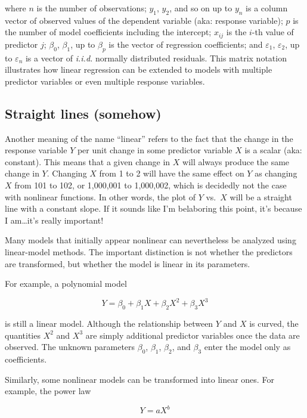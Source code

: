 \documentclass[
  13,
  letterpaper,
]{report}
\begin{document}
where \(n\) is the number of observations; \(y_1\), \(y_2\), and so on
up to \(y_n\) is a column vector of observed values of the dependent
variable (aka: response variable); \(p\) is the number of model
coefficients including the intercept; \(x_{ij}\) is the \(i\)-th value
of predictor \(j\); \(\beta_0\), \(\beta_1\), up to \(\beta_p\) is the
vector of regression coefficients; and \(\varepsilon_1\),
\(\varepsilon_2\), up to \(\varepsilon_n\) is a vector of \emph{i.i.d.}
normally distributed residuals. This matrix notation illustrates how
linear regression can be extended to models with multiple predictor
variables or even multiple response variables.

\subsection{Straight lines (somehow)}\label{straight-lines-somehow}

Another meaning of the name ``linear'' refers to the fact that the
change in the response variable \(Y\) per unit change in some predictor
variable \(X\) is a scalar (aka: constant). This means that a given
change in \(X\) will always produce the same change in \(Y\). Changing
\(X\) from 1 to 2 will have the same effect on \(Y\) as changing \(X\)
from 101 to 102, or 1,000,001 to 1,000,002, which is decidedly not the
case with nonlinear functions. In other words, the plot of \(Y\)
vs.~\(X\) will be a straight line with a constant slope. If it sounds
like I'm belaboring this point, it's because I am\ldots it's really
important!

Many models that initially appear nonlinear can nevertheless be analyzed
using linear-model methods. The important distinction is not whether the
predictors are transformed, but whether the model is linear in its
parameters.

For example, a polynomial model

\[Y = \beta_0 + \beta_1X + \beta_2X^2 + \beta_3X^3\]

is still a linear model. Although the relationship between \(Y\) and
\(X\) is curved, the quantities \(X^2\) and \(X^3\) are simply
additional predictor variables once the data are observed. The unknown
parameters \(\beta_0\), \(\beta_1\), \(\beta_2\), and \(\beta_3\) enter
the model only as coefficients.

Similarly, some nonlinear models can be transformed into linear ones.
For example, the power law

\[Y = aX^b\]
\end{document}
